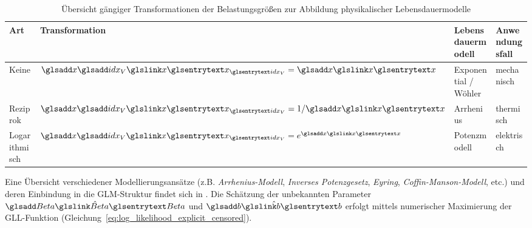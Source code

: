 \begin{table}[htbp]
    \centering
    \caption{Übersicht gängiger Transformationen der Belastungsgrößen zur Abbildung physikalischer Lebensdauermodelle}
    \label{tab:belastungstransformationen}
    \renewcommand{\arraystretch}{1.2}
    \begin{tabular}{@{}llll@{}}
        \toprule
        \textbf{Art}  & \textbf{Transformation}           & \textbf{Lebensdauermodell} & \textbf{Anwendungsfall} \\
        \midrule
        Keine         & $\symsub{x}{idx_V} = \sym{x}$     & Exponential / Wöhler       & mechanisch              \\
        Reziprok      & $\symsub{x}{idx_V} = 1/\sym{x}$   & Arrhenius                  & thermisch               \\
        Logarithmisch & $\symsub{x}{idx_V} = e^{\sym{x}}$ & Potenzmodell               & elektrisch              \\
        \bottomrule
    \end{tabular}
\end{table}
Eine Übersicht verschiedener Modellierungsansätze (z.B. \textit{Arrhenius-Modell}, \textit{Inverses Potenzgesetz}, \textit{Eyring}, \textit{Coffin-Manson-Modell}, etc.) und deren Einbindung in die \ac{GLM}-Struktur findet sich in \cite{Meeker.2022,Rigdon.2022,Modarres.2017}.
Die Schätzung der unbekannten Parameter $\hat{\sym{Beta}}$ und $\hat{\sym{b}}$ erfolgt mittels numerischer Maximierung der \ac{GLL}-Funktion (Gleichung~\ref{eq:log_likelihood_explicit_censored}).


